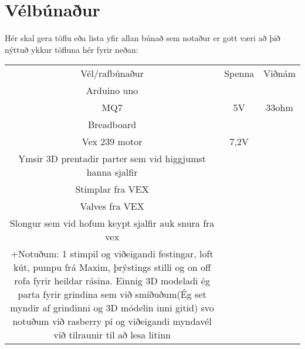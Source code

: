 \section{Vélbúnaður}
Hér skal gera töflu eða lista yfir allan búnað sem notaður er gott væri að þið nýttuð ykkur töfluna hér fyrir neðan:

\begin{center}
\begin{tabular}{ |c|c|c| } 
 \hline
 Vél/rafbúnaður &Spenna &Viðnám\\ 
 Arduino uno & &\\ 
 MQ7 &5V & 33ohm \\ 
 Breadboard & & \\
 Vex 239 motor & 7,2V & \\
 Ymsir 3D prentadir parter sem vid higgjumst hanna sjalfir \\
 Stimplar fra VEX\\
 Valves fra VEX\\
 Slongur sem vid hofum keypt sjalfir auk snura fra vex\\
+Notuðum: 1 stimpil og viðeigandi festingar, loft kút, pumpu frá Maxim, þrýstings stilli og on off rofa fyrir heildar rásina. Einnig 3D modeladi ég parta fyrir grindina sem við smíðuðum(Ég set myndir af grindinni og 3D módelin inni gitid) svo notuðum við rasberry pí og viðeigandi myndavél við tilraunir til að lesa litinn
 \hline
\end{tabular}
\end{center}